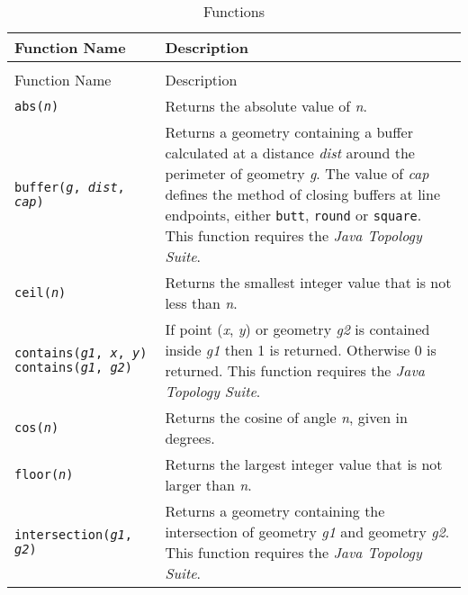 \begin{longtable}{|p{5cm}|p{7cm}|}
\hline
\label{functions}
Function Name & Description \\
\hline
\hline
\endfirsthead
\hline
\caption{Functions} \\
\endfoot

\hline
Function Name & Description \\
\hline
\hline
\endhead

\texttt{abs(\textit{n})} &
Returns the absolute value of \textit{n}. \\

\hline

\texttt{buffer(\textit{g}, \textit{dist}, \textit{cap})} &
Returns a geometry containing a buffer calculated at
a distance \textit{dist} around the perimeter of geometry \textit{g}.
The value of \textit{cap} defines
the method of closing buffers at line endpoints, either
\texttt{butt}, \texttt{round} or \texttt{square}.
This function requires the \textit{Java Topology Suite}. \\

\hline

\texttt{ceil(\textit{n})} &
Returns the smallest integer value that is not less than \textit{n}. \\

\hline

\texttt{contains(\textit{g1}, \textit{x}, \textit{y})}
\texttt{contains(\textit{g1}, \textit{g2})} &
If point (\textit{x}, \textit{y}) or geometry \textit{g2}
is contained inside \textit{g1} then
1 is returned.  Otherwise 0 is returned.
This function requires the \textit{Java Topology Suite}. \\

\hline

\texttt{cos(\textit{n})} &
Returns the cosine of angle \textit{n}, given in degrees. \\

\hline

\texttt{floor(\textit{n})} &
Returns the largest integer value that is not larger than \textit{n}. \\

\hline

\texttt{intersection(\textit{g1}, \textit{g2})} &
Returns a geometry containing the intersection
of geometry \textit{g1} and geometry \textit{g2}.
This function requires the \textit{Java Topology Suite}. \\

\hline


\end{longtable}
